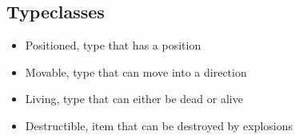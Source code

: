 \documentclass[a4paper, 12]{article}
\begin{document}
		\subsection{Typeclasses}
			\begin{itemize}
				\item Positioned, type that has a position
				\item Movable, type that can move into a direction
				\item Living, type that can either be dead or alive
				\item Destructible, item that can be destroyed by explosions
			\end{itemize}
		
		
\end{document}

